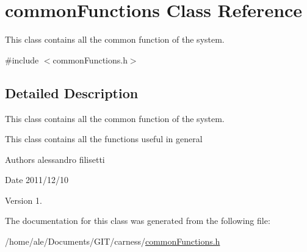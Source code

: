 \hypertarget{a00007}{\section{common\-Functions Class Reference}
\label{a00007}
}


This class contains all the common function of the system.  




{\ttfamily \#include $<$common\-Functions.\-h$>$}



\subsection{Detailed Description}
This class contains all the common function of the system. 

This class contains all the functions useful in general \begin{DoxyAuthor}{Authors}
alessandro filisetti 
\end{DoxyAuthor}
\begin{DoxyDate}{Date}
2011/12/10 
\end{DoxyDate}
\begin{DoxyVersion}{Version}
1. 
\end{DoxyVersion}


The documentation for this class was generated from the following file\-:\begin{DoxyCompactItemize}
\item 
/home/ale/\-Documents/\-G\-I\-T/carness/\hyperlink{a00070}{common\-Functions.\-h}\end{DoxyCompactItemize}
